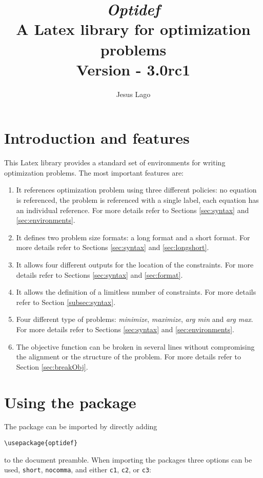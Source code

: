 \documentclass[a4paper]{article}
\title{\textit{\textbf{Optidef}} \\ A Latex library for optimization problems\\ \textnormal{Version - 3.0rc1}}
\author{Jesus Lago}
\begin{document}
\maketitle

\newpage

\tableofcontents

\newpage

\section{Introduction and features}

This Latex library provides a standard set of environments for writing optimization problems. The most important features are:
\begin{enumerate}
\item It references optimization problem using three different policies: no equation is referenced, the problem is referenced with a single label, each equation has an individual reference. For more details refer to Sections \ref{sec:syntax} and \ref{sec:environments}.
\item It defines two problem size formats: a long format and a short format. For more details refer to Sections \ref{sec:syntax} and \ref{sec:longshort}.
\item It allows four different outputs for the location of the constraints. For more details refer to Sections \ref{sec:syntax} and \ref{sec:format}.
\item It allows the definition of a limitless number of constraints. For more details refer to Section \ref{subsec:syntax}.
\item Four different type of problems: \textit{minimize}, \textit{maximize}, \textit{arg min} and \textit{arg max}. For more details refer to Sections \ref{sec:syntax} and \ref{sec:environments}.
\item The objective function can be broken in several lines without compromising the alignment or the structure of the problem. For more details refer to Section \ref{sec:breakObj}.
\end{enumerate}

\section{Using the package}
The package can be imported by directly adding
\begin{lstlisting}
\usepackage{optidef}
\end{lstlisting}
to the document preamble. When importing the packages three options can be used, \verb|short|, \verb|nocomma|, and either \verb|c1|, \verb|c2|, or \verb|c3|:
\end{document}
